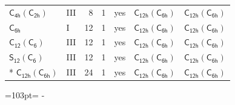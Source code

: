 \documentclass[10pt,a4paper]{article}
\newcommand{\needspace}[1]{\par\penalty-100\begingroup\dimen0=#1\relax\dimen2=\pagegoal
  \advance\dimen2-\pagetotal\ifdim\dimen0>\dimen2\relax\ifdim\dimen2>0pt\vfil\break\fi\fi
  \endgroup}
\numberwithin{equation}{section}
\newcommand{\grp}[1]{\mathsf{#1}}
\begin{document}
{\begin{longtable}{@{}llrrlll@{}}
\href{C4h-C2h.pdf}{$\grp{C_{4h}}(\grp{C_{2h}})$} & III & 8 & 1 & yes & \href{C12h-C6h.pdf}{$\grp{C_{12h}}(\grp{C_{6h}})$} & \href{C12h-C6h.pdf}{$\grp{C_{12h}}(\grp{C_{6h}})$}\\
\href{../../../rotation/data/pdf/C6h.pdf}{$\grp{C_{6h}}$} & I & 12 & 1 & yes & \href{C12h-C6h.pdf}{$\grp{C_{12h}}(\grp{C_{6h}})$} & \href{C12h-C6h.pdf}{$\grp{C_{12h}}(\grp{C_{6h}})$}\\
\href{C12-C6.pdf}{$\grp{C_{12}}(\grp{C_{6}})$} & III & 12 & 1 & yes & \href{C12h-C6h.pdf}{$\grp{C_{12h}}(\grp{C_{6h}})$} & \href{C12h-C6h.pdf}{$\grp{C_{12h}}(\grp{C_{6h}})$}\\
\href{S12-C6.pdf}{$\grp{S_{12}}(\grp{C_{6}})$} & III & 12 & 1 & yes & \href{C12h-C6h.pdf}{$\grp{C_{12h}}(\grp{C_{6h}})$} & \href{C12h-C6h.pdf}{$\grp{C_{12h}}(\grp{C_{6h}})$}\\*
\href{C12h-C6h.pdf}{$\grp{C_{12h}}(\grp{C_{6h}})$} & III & 24 & 1 & yes & \href{C12h-C6h.pdf}{$\grp{C_{12h}}(\grp{C_{6h}})$} & \href{C12h-C6h.pdf}{$\grp{C_{12h}}(\grp{C_{6h}})$}\\
\bottomrule\end{longtable}}
\needspace{103pt}
\end{document}
